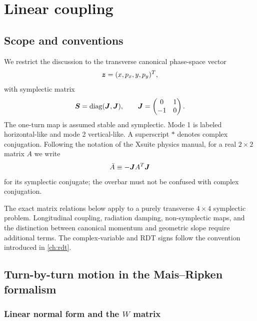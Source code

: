 \chapter{Linear coupling}
\label{ch:linear-coupling}

\section{Scope and conventions}

We restrict the discussion to the transverse canonical phase-space vector
\begin{equation}
 \bm{z}=(x,p_x,y,p_y)^T,
\end{equation}
with symplectic matrix
\begin{equation}
 \bm{S}=\operatorname{diag}(\bm{J},\bm{J}),
 \qquad
 \bm{J}=\begin{pmatrix}0&1\\-1&0\end{pmatrix}.
\end{equation}
The one-turn map is assumed stable and symplectic.  Mode 1 is labeled horizontal-like and mode 2 vertical-like.  A superscript $*$ denotes complex conjugation.  Following the notation of the Xsuite physics manual, for a real $2\times2$ matrix $A$ we write
\begin{equation}
 \bar A\equiv-\bm{J} A^T\bm{J}
\end{equation}
for its symplectic conjugate; the overbar must not be confused with complex
conjugation.

The exact matrix relations below apply to a purely transverse $4\times4$ symplectic problem.  Longitudinal coupling, radiation damping, non-symplectic maps, and the distinction between canonical momentum and geometric slope require additional terms.  The complex-variable and RDT signs follow the convention introduced in \cref{ch:rdt}.

\section{Turn-by-turn motion in the Mais--Ripken formalism}
\label{sec:mr}

\subsection{Linear normal form and the $W$ matrix}

